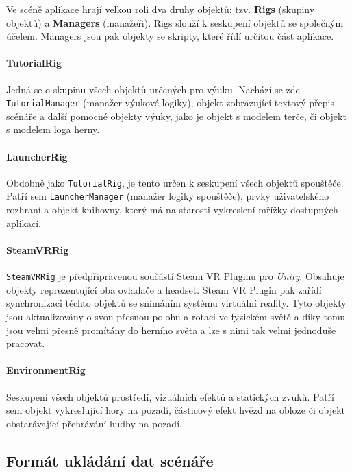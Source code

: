 Ve scéně aplikace hrají velkou roli dva druhy objektů: tzv.
\textbf{Rigs} (skupiny objektů) a \textbf{Managers} (manažeři). Rigs
slouží k seskupení objektů se společným účelem. Managers jsou pak
objekty se skripty, které řídí určitou část aplikace.

\paragraph{TutorialRig}\label{tutorialrig}

Jedná se o skupinu všech objektů určených pro výuku. Nachází se zde
\texttt{TutorialManager} (manažer výukové logiky), objekt zobrazující textový přepis scénáře a
další pomocné objekty výuky, jako je objekt s modelem terče, či objekt s
modelem loga herny.

\paragraph{LauncherRig}\label{launcherrig}

Obdobně jako \texttt{TutorialRig}, je tento určen k seskupení všech
objektů spouštěče. Patří sem \texttt{LauncherManager} (manažer logiky spouštěče), prvky
uživatelského rozhraní a objekt knihovny, který má na starosti
vykreslení mřížky dostupných aplikací.

\paragraph{SteamVRRig}\label{steamvrrig}

\texttt{SteamVRRig} je předpřipravenou součástí Steam VR Pluginu pro
\emph{Unity}. Obsahuje objekty reprezentující oba ovladače a headset.
Steam VR Plugin pak zařídí synchronizaci těchto objektů se snímáním
systému virtuální reality. Tyto objekty jsou aktualizovány o svou
přesnou polohu a rotaci ve fyzickém světě a díky tomu jsou velmi přesně
promítány do herního světa a lze s nimi tak velmi jednoduše pracovat.

\paragraph{EnvironmentRig}\label{environmentrig}

Seskupení všech objektů prostředí, vizuálních efektů a
statických zvuků. Patří sem objekt vykreslující hory na pozadí,
částicový efekt hvězd na obloze či objekt obstarávající přehrávání hudby
na pozadí.

\subsection{Formát ukládání dat
scénáře}\label{formuxe1t-ukluxe1duxe1nuxed-dat-scuxe9nuxe1ux159e}

